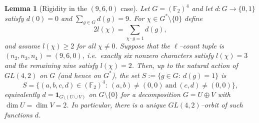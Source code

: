 \documentclass[12pt,twoside,]{amsart}
\theoremstyle{plain}
\newtheorem{lemma}[theorem]{Lemma}
\theoremstyle{definition}
\begin{document}
\begin{lemma}[Rigidity in the $(9,6,0)$ case]\label{lem:rigidity-960}
Let $G=(\mathbb F_2)^4$ and let $d:G\to\{0,1\}$ satisfy $d(0)=0$ and
$\sum_{g\in G} d(g)=9$.  For $\chi\in G^*\setminus\{0\}$ define
\[
2l(\chi)=\sum_{\chi\cdot g=1} d(g),
\]
and assume $l(\chi)\ge 2$ for all $\chi\ne 0$.  Suppose that the $\ell$--count
tuple is $(n_2,n_3,n_4)=(9,6,0)$, i.e.\ exactly six nonzero characters satisfy
$l(\chi)=3$ and the remaining nine satisfy $l(\chi)=2$.
Then, up to the natural action of $GL(4,2)$ on $G$ (and hence on $G^*$), the set
$S:=\{g\in G:\ d(g)=1\}$ is
\[
S=\{(a,b,c,d)\in(\mathbb F_2)^4:\ (a,b)\ne(0,0)\ \text{and}\ (c,d)\ne(0,0)\},
\]
equivalently $d=\mathbf 1_{G\setminus(U\cup V)}$ on $G\setminus\{0\}$ for a decomposition
$G=U\oplus V$ with $\dim U=\dim V=2$.  In particular, there is a unique
$GL(4,2)$--orbit of such functions $d$.
\end{lemma}
\end{document}
